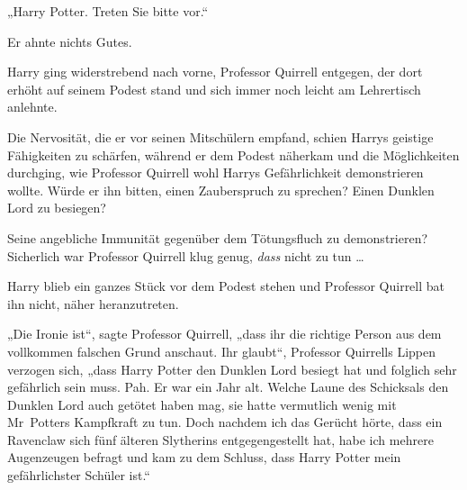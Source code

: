 „Harry Potter. Treten Sie bitte vor.“

Er ahnte nichts Gutes.

Harry ging widerstrebend nach vorne, Professor Quirrell entgegen, der dort erhöht auf seinem Podest stand und sich immer noch leicht am Lehrertisch anlehnte.

Die Nervosität, die er vor seinen Mitschülern empfand, schien Harrys geistige Fähigkeiten zu schärfen, während er dem Podest näherkam und die Möglichkeiten durchging, wie Professor Quirrell wohl Harrys Gefährlichkeit demonstrieren wollte. Würde er ihn bitten, einen Zauberspruch zu sprechen? Einen Dunklen Lord zu besiegen?

Seine angebliche Immunität gegenüber dem Tötungsfluch zu demonstrieren? Sicherlich war Professor Quirrell klug genug, \emph{dass} nicht zu tun …

Harry blieb ein ganzes Stück vor dem Podest stehen und Professor Quirrell bat ihn nicht, näher heranzutreten.

„Die Ironie ist“, sagte Professor Quirrell, „dass ihr die richtige Person aus dem vollkommen falschen Grund anschaut. Ihr glaubt“, Professor Quirrells Lippen verzogen sich, „dass Harry Potter den Dunklen Lord besiegt hat und folglich sehr gefährlich sein muss. Pah. Er war ein Jahr alt. Welche Laune des Schicksals den Dunklen Lord auch getötet haben mag, sie hatte vermutlich wenig mit Mr~Potters Kampfkraft zu tun. Doch nachdem ich das Gerücht hörte, dass ein Ravenclaw sich fünf älteren Slytherins entgegengestellt hat, habe ich mehrere Augenzeugen befragt und kam zu dem Schluss, dass Harry Potter mein gefährlichster Schüler ist.“


